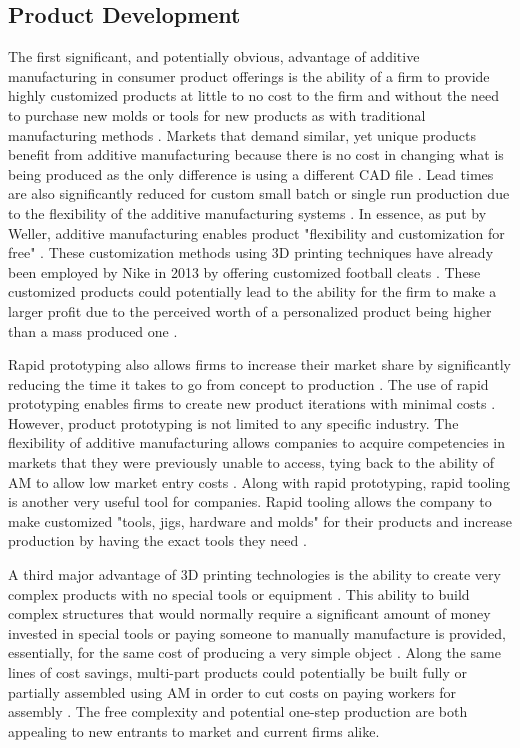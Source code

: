 \subsection{Product Development}
	The first significant, and potentially obvious, advantage of additive manufacturing in consumer product offerings is the ability of a firm to provide highly customized products at little to no cost to the firm and without the need to purchase new molds or tools for new products as with traditional manufacturing methods \citep{Weller2015, Rayna2016}. Markets that demand similar, yet unique products benefit from additive manufacturing because there is no cost in changing what is being produced as the only difference is using a different CAD file \citep{Weller2015, Rayna2016}. Lead times are also significantly reduced for custom small batch or single run production due to the flexibility of the additive manufacturing systems \citep{Weller2015, Rayna2016}. In essence, as put by Weller, additive manufacturing enables product "flexibility and customization for free" \citep{Weller2015}. These customization methods using 3D printing techniques have already been employed by Nike in 2013 by offering customized football cleats \citep{Weller2015}. These customized products could potentially lead to the ability for the firm to make a larger profit due to the perceived worth of a personalized product being higher than a mass produced one \citep{Weller2015}.\par
	Rapid prototyping also allows firms to increase their market share by significantly reducing the time it takes to go from concept to production \citep{Weller2015, Rayna2016}. The use of rapid prototyping enables firms to create new product iterations with minimal costs \citep{Weller2015}. However, product prototyping is not limited to any specific industry. The flexibility of additive manufacturing allows companies to acquire competencies in markets that they were previously unable to access, tying back to the ability of AM to allow low market entry costs \citep{Rayna2016}. Along with rapid prototyping, rapid tooling is another very useful tool for companies. Rapid tooling allows the company to make customized "tools, jigs, hardware and molds" for their products and increase production by having the exact tools they need \citep{Rayna2016}.\par
	A third major advantage of 3D printing technologies is the ability to create very complex products with no special tools or equipment \citep{Weller2015}. This ability to build complex structures that would normally require a significant amount of money invested in special tools or paying someone to manually manufacture is provided, essentially, for the same cost of producing a very simple object \citep{Weller2015}. Along the same lines of cost savings, multi-part products could potentially be built fully or partially assembled using AM in order to cut costs on paying workers for assembly \citep{Weller2015}. The free complexity and potential one-step production are both appealing to new entrants to market and current firms alike.

